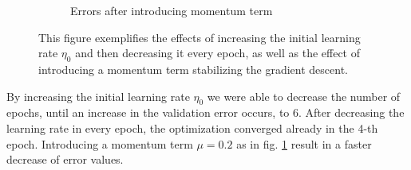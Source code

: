 \begin{itemize}
\begin{figure}[!ht]
\begin{subfigure}[b]{.45\textwidth}
		\caption{Errors after introducing momentum term}
		\label{fig:increase_momentum}
		\end{subfigure}
		\caption{This figure exemplifies the effects of increasing the initial learning rate $\eta_0$ and then decreasing it every epoch, as well as the effect of introducing a momentum term stabilizing the gradient descent.}
		\label{fig:effects_learning_rate}
		\end{figure}
	By increasing the initial learning rate $\eta_0$ we were able to decrease the number of epochs, until an increase in the validation error occurs, to 6. After decreasing the learning rate in every epoch, the optimization converged already in the 4-th epoch. Introducing a momentum term $\mu = 0.2$ as in fig. \ref{fig:increase_momentum} result in a faster decrease of error values.


\end{itemize}
